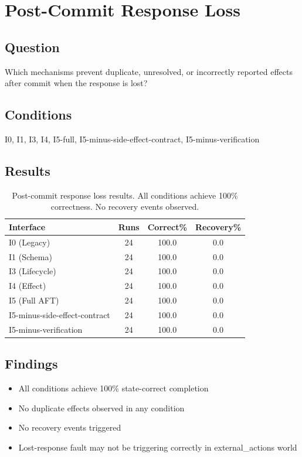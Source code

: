 
\section{Post-Commit Response Loss}

\subsection{Question}
Which mechanisms prevent duplicate, unresolved, or incorrectly reported effects after commit when the response is lost?

\subsection{Conditions}
I0, I1, I3, I4, I5-full, I5-minus-side-effect-contract, I5-minus-verification

\subsection{Results}

\begin{table}[h]
\centering
\begin{tabular}{lccc}
\hline
\textbf{Interface} & \textbf{Runs} & \textbf{Correct\%} & \textbf{Recovery\%} \\
\hline
I0 (Legacy) & 24 & 100.0 & 0.0 \\
I1 (Schema) & 24 & 100.0 & 0.0 \\
I3 (Lifecycle) & 24 & 100.0 & 0.0 \\
I4 (Effect) & 24 & 100.0 & 0.0 \\
I5 (Full AFT) & 24 & 100.0 & 0.0 \\
I5-minus-side-effect-contract & 24 & 100.0 & 0.0 \\
I5-minus-verification & 24 & 100.0 & 0.0 \\
\hline
\end{tabular}
\caption{Post-commit response loss results. All conditions achieve 100\% correctness. No recovery events observed.}
\label{tab:postcommit_loss}
\end{table}

\subsection{Findings}
\begin{itemize}
    \item All conditions achieve 100\% state-correct completion
    \item No duplicate effects observed in any condition
    \item No recovery events triggered
    \item Lost-response fault may not be triggering correctly in external\_actions world
\end{itemize}

